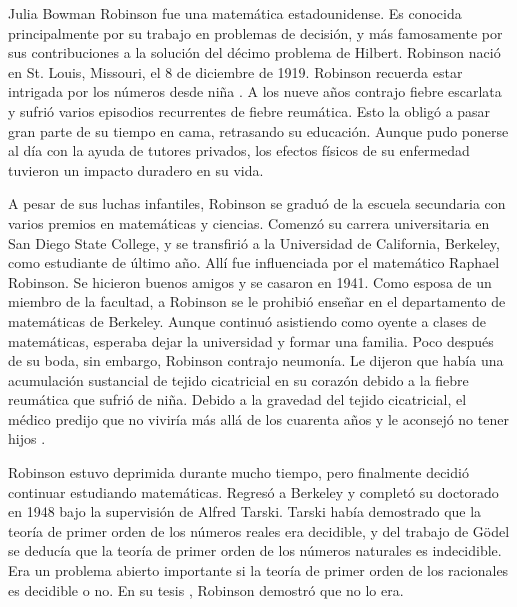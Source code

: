 \documentclass[../../../include/open-logic-section]{subfiles}
\begin{document}



Julia Bowman Robinson fue una matemática estadounidense. Es conocida principalmente por su trabajo en problemas de decisión, y más famosamente por sus contribuciones a la solución del décimo problema de Hilbert. Robinson nació en St. Louis, Missouri, el 8 de diciembre de 1919. Robinson recuerda estar intrigada por los números desde niña \citep[4]{Reid1986}. A los nueve años contrajo fiebre escarlata y sufrió varios episodios recurrentes de fiebre reumática. Esto la obligó a pasar gran parte de su tiempo en cama, retrasando su educación. Aunque pudo ponerse al día con la ayuda de tutores privados, los efectos físicos de su enfermedad tuvieron un impacto duradero en su vida.

A pesar de sus luchas infantiles, Robinson se graduó de la escuela secundaria con varios premios en matemáticas y ciencias. Comenzó su carrera universitaria en San Diego State College, y se transfirió a la Universidad de California, Berkeley, como estudiante de último año. Allí fue influenciada por el matemático Raphael Robinson. Se hicieron buenos amigos y se casaron en 1941. Como esposa de un miembro de la facultad, a Robinson se le prohibió enseñar en el departamento de matemáticas de Berkeley. Aunque continuó asistiendo como oyente a clases de matemáticas, esperaba dejar la universidad y formar una familia. Poco después de su boda, sin embargo, Robinson contrajo neumonía. Le dijeron que había una acumulación sustancial de tejido cicatricial en su corazón debido a la fiebre reumática que sufrió de niña. Debido a la gravedad del tejido cicatricial, el médico predijo que no viviría más allá de los cuarenta años y le aconsejó no tener hijos \citep[13]{Reid1986}.

Robinson estuvo deprimida durante mucho tiempo, pero finalmente decidió continuar estudiando matemáticas. Regresó a Berkeley y completó su doctorado en 1948 bajo la supervisión de Alfred Tarski. Tarski había demostrado que la teoría de primer orden de los números reales era decidible, y del trabajo de G\"odel se deducía que la teoría de primer orden de los números naturales es indecidible. Era un problema abierto importante si la teoría de primer orden de los racionales es decidible o no. En su tesis \citeyearpar{Robinson1949}, Robinson demostró que no lo era.
\end{document}
